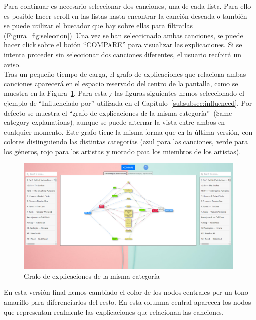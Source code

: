 Para continuar es necesario seleccionar dos canciones, una de cada lista. Para ello es posible hacer scroll en las listas hasta encontrar la canción deseada o también se puede utilizar el buscador que hay sobre ellas para filtrarlas (Figura~\ref{fig:seleccion}). Una vez se han seleccionado ambas canciones, se puede hacer click sobre el botón ``COMPARE'' para visualizar las explicaciones. Si se intenta proceder sin seleccionar dos canciones diferentes, el usuario recibirá un aviso.\\

Tras un pequeño tiempo de carga, el grafo de explicaciones que relaciona ambas canciones aparecerá en el espacio reservado del centro de la pantalla, como se muestra en la Figura~\ref{fig:mismaCategoria}. Para esta y las figuras siguientes hemos seleccionado el ejemplo de ``Influenciado por'' utilizada en el Capítulo~\ref{subsubsec:influenced}. Por defecto se muestra el ``grafo de explicaciones de la misma categoría''~(Same category explanations), aunque se puede alternar la vista entre ambos en cualquier momento. Este grafo tiene la misma forma que en la última versión, con colores distinguiendo las distintas categorías (azul para las canciones, verde para los géneros, rojo para los artistas y morado para los miembros de los artistas).\\

\clearpage

\begin{figure}[h!]
	\centering
	\includegraphics[width = 1\textwidth]{Imagenes/Bitmap/Pantalla same graph.png}
	\caption{Grafo de explicaciones de la misma categoría}
	\label{fig:mismaCategoria}
\end{figure}

En esta versión final hemos cambiado el color de los nodos centrales por un tono amarillo para diferenciarlos del resto. En esta columna central aparecen los nodos que representan realmente las explicaciones que relacionan las canciones.\\

